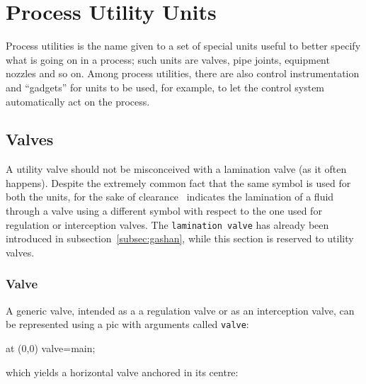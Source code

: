 \documentclass[12pt]{article}						%
\newcommand*{\ac}[1]{%
		\textsmaller{#1}%
	}
\newcommand*{\chpn}[1]{\texttt{#1}}				%
\newcommand*{\chpp}[1]{\texttt{#1}}				%
\newcommand*{\UNICHIM}{\ac{UNICHIM}}
\begin{document}
\section{Process Utility Units}

Process utilities is the name given to a set of special units useful to
better specify what is going on in a process; such units are valves, pipe joints,
equipment nozzles and so on. Among process utilities, there are also control
instrumentation and ``gadgets'' for units to be used, for example, to let
the control system automatically act on the process.

\subsection{Valves}

A utility valve should not be misconceived with a lamination valve (as it often
happens). Despite the extremely common fact that the same symbol is used for
both the units, for the sake of clearance \UNICHIM\ indicates the lamination of
a fluid through a valve using a different symbol with respect to the one used
for regulation or interception valves. The \chpp{lamination valve} has already
been introduced in subsection~\ref{subsec:gashan}, while this section is reserved
to utility valves.

\subsubsection{Valve}

A generic valve, intended as a a regulation valve or as an interception valve,
can be represented using a pic with arguments called \chpp{valve}:
\begin{chpcode}
	\pic at (0,0) {valve=main};
\end{chpcode}
which yields a horizontal valve anchored in its centre:
\begin{center}
\end{center}
\end{document}
